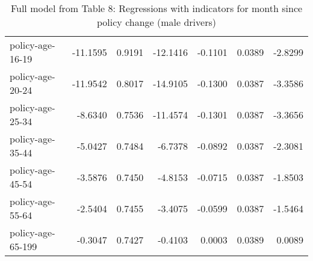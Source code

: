 \documentclass[10pt]{article}
\begin{document}
\begin{table}[b!]
\begin{tabular}{lrrrrrr}
  policy-age-16-19 & -11.1595 & 0.9191 & -12.1416 & -0.1101 & 0.0389 & -2.8299 \\ 
  policy-age-20-24 & -11.9542 & 0.8017 & -14.9105 & -0.1300 & 0.0387 & -3.3586 \\ 
  policy-age-25-34 & -8.6340 & 0.7536 & -11.4574 & -0.1301 & 0.0387 & -3.3656 \\ 
  policy-age-35-44 & -5.0427 & 0.7484 & -6.7378 & -0.0892 & 0.0387 & -2.3081 \\ 
  policy-age-45-54 & -3.5876 & 0.7450 & -4.8153 & -0.0715 & 0.0387 & -1.8503 \\ 
  policy-age-55-64 & -2.5404 & 0.7455 & -3.4075 & -0.0599 & 0.0387 & -1.5464 \\ 
  policy-age-65-199 & -0.3047 & 0.7427 & -0.4103 & 0.0003 & 0.0389 & 0.0089 \\ 
   \hline
\end{tabular}
\caption{Full model from Table 8: Regressions with indicators for month since policy change (male drivers)} 
\label{tab_8_all_pts_M}
\end{table}


\clearpage
\pagebreak



\end{document}
